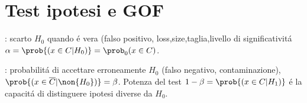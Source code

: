 \section{Test ipotesi e GOF}

: scarto $H_0$ quando \'e vera (falso positivo, loss,size,taglia,livello di significativit\'a $\alpha=\prob{(x\in C|H_0)}=\prob_0{(x\in C)}$.

: probabilit\'a di accettare erroneamente $H_0$ (falso negativo, contaminazione), $\prob{(x\in\overline{C}|\non{H_0})}=\beta$. Potenza del test $1-\beta=\prob{(x\in C|H_1)}$ \'e la capacit\'a di distinguere ipotesi diverse da $H_0$.
